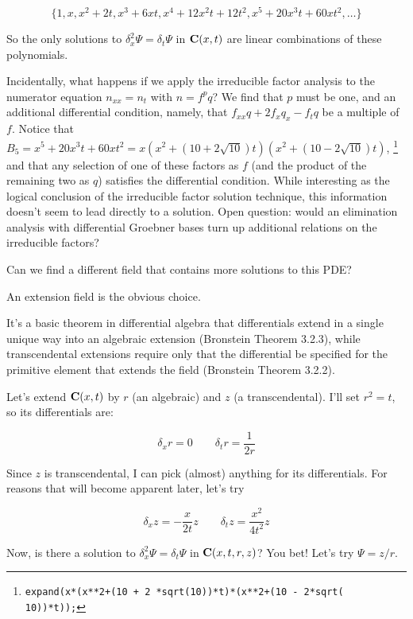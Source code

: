 \documentclass{article}
\newcommand{\C}{\ensuremath{{\bf C}}}
\begin{document}
%
%

$$\{1, x, x^2 + 2t, x^3 + 6xt, x^4 + 12 x^2t + 12 t^2, x^5+20x^3t+60xt^2, \ldots\}$$

So the only solutions to $\delta_x^2 \Psi = \delta_t \Psi$ in
$\C(x,t)$ are linear combinations of these polynomials.

Incidentally, what happens if we apply the irreducible factor analysis
to the numerator equation $n_{xx}=n_t$ with $n=f^p q$?  We find that
$p$ must be one, and an additional differential condition, namely,
that $f_{xx}q+2f_x q_x - f_t q$ be a multiple of $f$.  Notice that
$B_5 = x^5+20x^3t+60xt^2 =
x(x^2+(10+2\sqrt{10})t)(x^2+(10-2\sqrt{10})t)$,
\footnote{\tt expand(x*(x**2+(10 + 2 *sqrt(10))*t)*(x**2+(10 - 2*sqrt( 10))*t));}
and that any selection
of one of these factors as $f$ (and the product of the remaining two
as $q$) satisfies the differential condition.  While interesting as
the logical conclusion of the irreducible factor solution technique,
this information doesn't seem to lead directly to a solution.  Open
question: would an elimination analysis with differential Groebner
bases turn up additional relations on the irreducible factors?

Can we find a different field that contains more solutions to this PDE?

An extension field is the obvious choice.

It's a basic theorem in differential algebra that differentials extend
in a single unique way into an algebraic extension (Bronstein Theorem
3.2.3), while transcendental extensions require only that the
differential be specified for the primitive element that extends the
field (Bronstein Theorem 3.2.2).

Let's extend $\C(x,t)$ by $r$ (an algebraic) and $z$ (a
transcendental).  I'll set $r^2 = t$, so its differentials are:

$$\delta_x r = 0 \qquad \delta_t r = \frac{1}{2r} $$


Since $z$ is transcendental, I can pick (almost) anything for its differentials.  For
reasons that will become apparent later, let's try

$$\delta_x z = -\frac{x}{2t} z \qquad \delta_t z = \frac{x^2}{4t^2} z$$

Now, is there a solution to $\delta_x^2 \Psi = \delta_t \Psi$ in
$\C(x,t,r,z)$?  You bet!  Let's try $\Psi = z/r$.
\end{document}
